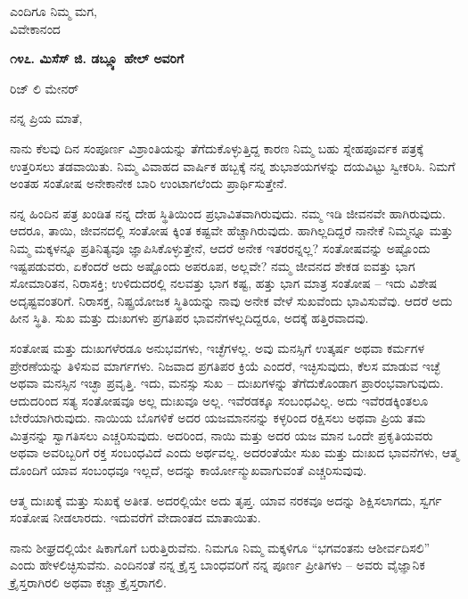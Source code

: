 \begin{flushright}
ಎಂದಿಗೂ ನಿಮ್ಮ ಮಗ,\\ವಿವೇಕಾನಂದ
\end{flushright}

\begin{center}
\textbf{೧೪೭. ಮಿಸೆಸ್ ಜಿ. ಡಬ್ಲ್ಯೂ ಹೇಲ್ ಅವರಿಗೆ}
\end{center}

\begin{flushright}
ರಿಜ್ ಲಿ ಮೇನರ್
\end{flushright}

ನನ್ನ ಪ್ರಿಯ ಮಾತೆ,

ನಾನು ಕೆಲವು ದಿನ ಸಂಪೂರ್ಣ ವಿಶ್ರಾಂತಿಯನ್ನು ತೆಗೆದುಕೊಳ್ಳುತ್ತಿದ್ದ ಕಾರಣ ನಿಮ್ಮ ಬಹು ಸ್ನೇಹಪೂರ್ವಕ ಪತ್ರಕ್ಕೆ ಉತ್ತರಿಸಲು ತಡವಾಯಿತು. ನಿಮ್ಮ ವಿವಾಹದ ವಾರ್ಷಿಕ ಹಬ್ಬಕ್ಕೆ ನನ್ನ ಶುಭಾಶಯಗಳನ್ನು ದಯವಿಟ್ಟು ಸ್ವೀಕರಿಸಿ. ನಿಮಗೆ ಅಂತಹ ಸಂತೋಷ ಅನೇಕಾನೇಕ ಬಾರಿ ಉಂಟಾಗಲೆಂದು ಪ್ರಾರ್ಥಿಸುತ್ತೇನೆ.

ನನ್ನ ಹಿಂದಿನ ಪತ್ರ ಖಂಡಿತ ನನ್ನ ದೇಹ ಸ್ಥಿತಿಯಿಂದ ಪ್ರಭಾವಿತವಾಗಿರುವುದು. ನಮ್ಮ ಇಡಿ ಜೀವನವೇ ಹಾಗಿರುವುದು. ಆದರೂ, ತಾಯಿ, ಜೀವನದಲ್ಲಿ ಸಂತೋಷ ಕ್ಕಿಂತ ಕಷ್ಟವೇ ಹೆಚ್ಚಾಗಿರುವುದು. ಹಾಗಿಲ್ಲದಿದ್ದರೆ ನಾನೇಕೆ ನಿಮ್ಮನ್ನೂ ಮತ್ತು ನಿಮ್ಮ ಮಕ್ಕಳನ್ನೂ ಪ್ರತಿನಿತ್ಯವೂ ಜ್ಞಾಪಿಸಿಕೊಳ್ಳುತ್ತೇನೆ, ಆದರೆ ಅನೇಕ ಇತರರನ್ನಲ್ಲ? ಸಂತೋಷವನ್ನು ಅಷ್ಟೊಂದು ಇಷ್ಟಪಡುವರು, ಏಕೆಂದರೆ ಅದು ಅಷ್ಟೊಂದು ಅಪರೂಪ, ಅಲ್ಲವೇ? ನಮ್ಮ ಜೀವನದ ಶೇಕಡ ಐವತ್ತು ಭಾಗ ಸೋಮಾರಿತನ, ನಿರಾಸಕ್ತಿ; ಉಳಿದುದರಲ್ಲಿ ನಲವತ್ತು ಭಾಗ ಕಷ್ಟ, ಹತ್ತು ಭಾಗ ಮಾತ್ರ ಸಂತೋಷ – ಇದು ವಿಶೇಷ ಅದೃಷ್ಟವಂತರಿಗೆ. ನಿರಾಸಕ್ತ, ನಿಷ್ಪ್ರಯೋಜಕ ಸ್ಥಿತಿಯನ್ನು ನಾವು ಅನೇಕ ವೇಳೆ ಸುಖವೆಂದು ಭಾವಿಸುವೆವು. ಆದರೆ ಅದು ಹೀನ ಸ್ಥಿತಿ. ಸುಖ ಮತ್ತು ದುಃಖಗಳು ಪ್ರಗತಿಪರ ಭಾವನೆಗಳಲ್ಲದಿದ್ದರೂ, ಅದಕ್ಕೆ ಹತ್ತಿರವಾದವು.

ಸಂತೋಷ ಮತ್ತು ದುಃಖಗಳೆರಡೂ ಅನುಭವಗಳು, ಇಚ್ಛೆಗಳಲ್ಲ. ಅವು ಮನಸ್ಸಿಗೆ ಉತ್ಕರ್ಷ ಅಥವಾ ಕರ್ಮಗಳ ಪ್ರೇರಣೆಯನ್ನು ತಿಳಿಸುವ ಮಾರ್ಗಗಳು. ನಿಜವಾದ ಪ್ರಗತಿಪರ ಕ್ರಿಯೆ ಎಂದರೆ, ಇಚ್ಛಿಸುವುದು, ಕೆಲಸ ಮಾಡುವ ಇಚ್ಛೆ ಅಥವಾ ಮನಸ್ಸಿನ ಇಚ್ಛಾ ಪ್ರವೃತ್ತಿ. ಇದು, ಮನಸ್ಸು ಸುಖ – ದುಃಖಗಳನ್ನು ತೆಗೆದುಕೊಂಡಾಗ ಪ್ರಾರಂಭವಾಗುವುದು. ಆದುದರಿಂದ ಸತ್ಯ ಸಂತೋಷವೂ ಅಲ್ಲ ದುಃಖವೂ ಅಲ್ಲ. ಇವೆರಡಕ್ಕೂ ಸಂಬಂಧವಿಲ್ಲ. ಅದು ಇವೆರಡಕ್ಕಿಂತಲೂ ಬೇರೆಯಾಗಿರುವುದು. ನಾಯಿಯ ಬೊಗಳಿಕೆ ಅದರ ಯಜಮಾನನನ್ನು ಕಳ್ಳರಿಂದ ರಕ್ಷಿಸಲು ಅಥವಾ ಪ್ರಿಯ ತಮ ಮಿತ್ರನನ್ನು ಸ್ವಾಗತಿಸಲು ಎಚ್ಚರಿಸುವುದು. ಅದರಿಂದ, ನಾಯಿ ಮತ್ತು ಅದರ ಯಜ ಮಾನ ಒಂದೇ ಪ್ರಕೃತಿಯವರು ಅಥವಾ ಅವರಿಬ್ಬರಿಗೆ ರಕ್ತ ಸಂಬಂಧವಿದೆ ಎಂದು ಅರ್ಥವಲ್ಲ. ಅದರಂತೆಯೇ ಸುಖ ಮತ್ತು ದುಃಖದ ಭಾವನೆಗಳು, ಆತ್ಮ ದೊಂದಿಗೆ ಯಾವ ಸಂಬಂಧವೂ ಇಲ್ಲದೆ, ಅದನ್ನು ಕಾರ್ಯೋನ್ಮುಖವಾಗುವಂತೆ ಎಚ್ಚರಿಸುವುವು.

ಆತ್ಮ ದುಃಖಕ್ಕೆ ಮತ್ತು ಸುಖಕ್ಕೆ ಅತೀತ. ಅದರಲ್ಲಿಯೇ ಅದು ತೃಪ್ತ. ಯಾವ ನರಕವೂ ಅದನ್ನು ಶಿಕ್ಷಿಸಲಾಗದು, ಸ್ವರ್ಗ ಸಂತೋಷ ನೀಡಲಾರದು. ಇದುವರೆಗೆ ವೇದಾಂತದ ಮಾತಾಯಿತು.

ನಾನು ಶೀಘ್ರದಲ್ಲಿಯೇ ಷಿಕಾಗೊಗೆ ಬರುತ್ತಿರುವೆನು. ನಿಮಗೂ ನಿಮ್ಮ ಮಕ್ಕಳಿಗೂ “ಭಗವಂತನು ಆಶೀರ್ವದಿಸಲಿ” ಎಂದು ಹೇಳಲಿಚ್ಛಿಸುವೆನು. ಎಂದಿನಂತೆ ನನ್ನ ಕ್ರೈಸ್ತ ಬಾಂಧವರಿಗೆ ನನ್ನ ಪೂರ್ಣ ಪ್ರೀತಿಗಳು – ಅವರು ವೈಜ್ಞಾನಿಕ ಕ್ರೈಸ್ತರಾಗಿರಲಿ ಅಥವಾ ಕಚ್ಚಾ ಕ್ರೈಸ್ತರಾಗಲಿ.

